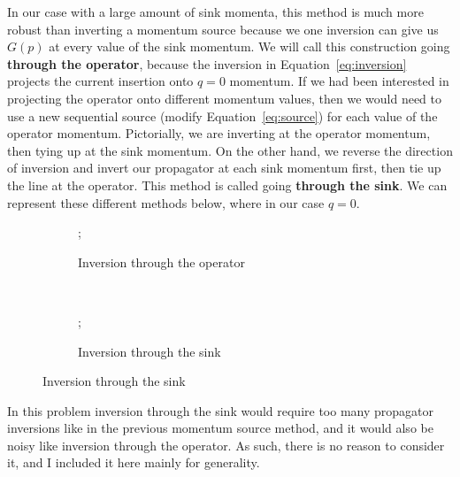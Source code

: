 \documentclass[11pt, oneside]{article}   	%
\theoremstyle{definition}
\begin{document}
In our case with a large amount of sink momenta, this method is much more robust than inverting a momentum source 
because we one inversion can give us $G(p)$ at every value of the sink momentum. We will call this construction going 
\textbf{through the operator}, because the inversion in Equation~\ref{eq:inversion} projects the current insertion onto $q = 0$ 
momentum. If we had been interested in projecting the operator onto different momentum values, then we would need to 
use a new sequential source (modify Equation~\ref{eq:source}) for each value of the operator momentum. Pictorially, we are 
inverting at the operator momentum, then tying up at the sink momentum. On the other hand, we reverse the direction of 
inversion and invert our propagator at each sink momentum first, then tie up the line at the operator. This method is called 
going \textbf{through the sink}. We can represent these different methods below, where in our case $q = 0$. 
\begin{figure}[H]
	\centering
	\begin{subfigure}[t]{.48\textwidth}
	\centering
		;
            	\caption{Inversion through the operator}
	\end{subfigure}
	~
	\begin{subfigure}[t]{.48\textwidth}
	\centering
		;
            	\caption{Inversion through the sink}
	\end{subfigure}
\end{figure}

In this problem inversion through the sink would require too many propagator inversions like in the previous momentum 
source method, and it would also be noisy like inversion through the operator. As such, there is no reason to consider it, 
and I included it here mainly for generality. 
\end{document}
